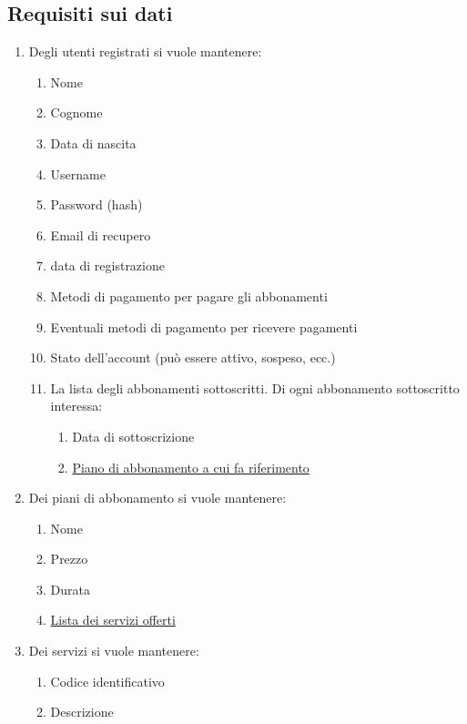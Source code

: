 
\subsection{Requisiti sui dati}
\begin{enumerate}

\item \hypertarget{AnReqUt}{Degli utenti registrati si vuole mantenere:}
	\begin{enumerate}[label*=\arabic*.]
	\item Nome
	\item Cognome
	\item Data di nascita
	\item Username
	\item Password (hash)
	\item Email di recupero
	\item data di registrazione
	\item Metodi di pagamento per pagare gli abbonamenti
	\item Eventuali metodi di pagamento per ricevere pagamenti
	\item Stato dell'account (può essere attivo, sospeso, ecc.)
	\item La lista degli abbonamenti sottoscritti. Di ogni abbonamento sottoscritto interessa:
		\begin{enumerate}[label*=\arabic*.]
		\item Data di sottoscrizione
		\item \hyperlink{AnReqPianiAbb}{Piano di abbonamento a cui fa riferimento}
		\end{enumerate}
	\end{enumerate}

\item \hypertarget{AnReqPianiAbb}{Dei piani di abbonamento si vuole mantenere:}
	\begin{enumerate}[label*=\arabic*.]
	\item Nome
	\item Prezzo
	\item Durata
	\item \hyperlink{AnReqServizi}{Lista dei servizi offerti}
	\end{enumerate}

\item \hypertarget{AnReqServizi}{Dei servizi si vuole mantenere:}
	\begin{enumerate}[label*=\arabic*.]
	\item Codice identificativo
	\item Descrizione
	\end{enumerate}


\end{enumerate}
